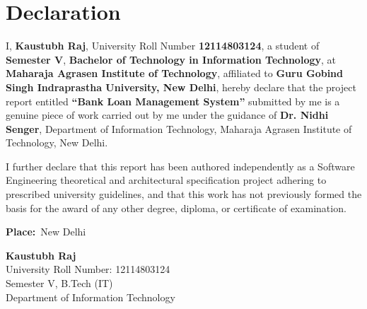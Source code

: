 \chapter*{Declaration}
\thispagestyle{empty}

I, \textbf{Kaustubh Raj}, University Roll Number \textbf{12114803124}, a student of \textbf{Semester V}, \textbf{Bachelor of Technology in Information Technology}, at \textbf{Maharaja Agrasen Institute of Technology}, affiliated to \textbf{Guru Gobind Singh Indraprastha University, New Delhi}, hereby declare that the project report entitled \textbf{``Bank Loan Management System''} submitted by me is a genuine piece of work carried out by me under the guidance of \textbf{Dr. Nidhi Senger}, Department of Information Technology, Maharaja Agrasen Institute of Technology, New Delhi.

I further declare that this report has been authored independently as a Software Engineering theoretical and architectural specification project adhering to prescribed university guidelines, and that this work has not previously formed the basis for the award of any other degree, diploma, or certificate of examination.

\vspace{2.5cm}

\noindent
\begin{minipage}{0.45\textwidth}
    
    \textbf{Place:}\ New Delhi
\end{minipage}
\hfill
\begin{minipage}{0.45\textwidth}
    \begin{flushright}
        \textbf{Kaustubh Raj}\\
        University Roll Number: 12114803124\\
        Semester V, B.Tech (IT)\\
        Department of Information Technology
    \end{flushright}
\end{minipage}
